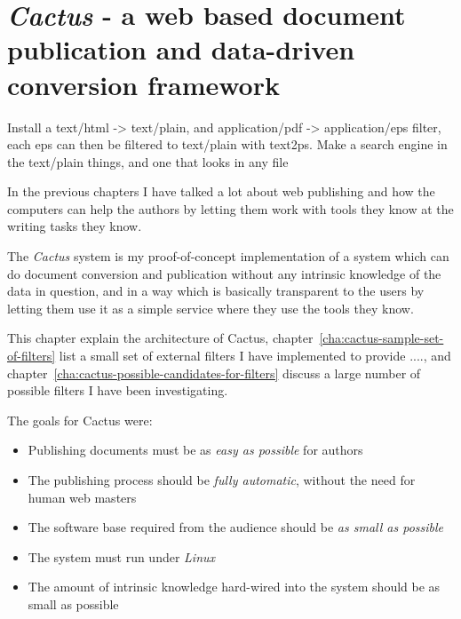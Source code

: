 



\chapter{\textit{Cactus} - a web based document publication and data-driven
  conversion framework}


\label{cha:cactus}
\label{sec:cactus}

\textsf{Install a text/html -> text/plain, and application/pdf ->
  application/eps filter, each eps can then be filtered to text/plain
  with text2ps.  Make a search engine in the text/plain things, and
  one that looks in any file}


In the previous chapters I have talked a lot about web
publishing and how the computers can help the authors by
letting them work with tools they know at the writing tasks
they know.

The \textit{Cactus} system is my proof-of-concept
implementation of a system which can do document conversion
and publication without any intrinsic knowledge of the data
in question, and in a way which is basically transparent to
the users by letting them use it as a simple service where
they use the tools they know.

This chapter explain the architecture of Cactus,
chapter~\vref{cha:cactus-sample-set-of-filters} list a small
set of external filters I have implemented to provide
\textsf{....}, and
chapter~\vref{cha:cactus-possible-candidates-for-filters}
discuss a large number of possible filters I have been
investigating.

The goals for Cactus were:

\begin{itemize}
\item Publishing documents must be as \textit{easy as
    possible} for authors
  
\item The publishing process should be \textit{fully
    automatic}, without the need for human web masters
  
\item The software base required from the audience should be
  \textit{as small as possible}
  
\item The system must run under \textit{Linux}
  
\item The amount of intrinsic knowledge hard-wired into the
  system should be as small as possible

\end{itemize}

